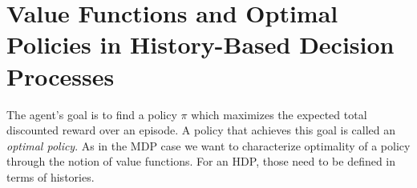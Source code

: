 \documentclass[
    a4paper,
    11pt,
    bibliography=totoc,
    listof=totoc,      
    headinclude=true,
    cleardoublepage=empty,
]{scrbook}
\theoremstyle{plain}
\newtheorem{lemma}[theorem]{Lemma}
\theoremstyle{definition}
\theoremstyle{remark}
\newcommand{\PM}{\mathbb P}
\newcommand{\SpaceA}{{\cal A}}
\newcommand{\SpaceO}{{\cal O}}
\newcommand{\SpaceH}{{\cal H}}
\begin{document}

\section[Value Functions and Optimal Policies in HDPs]{Value Functions and Optimal Policies in History-Based Decision Processes}
\label{chapter:HistoryRLEnvironment:section:ValueQFunctions}

The agent's goal is to find a policy $\pi$ which maximizes the expected total 
discounted reward over an episode. A policy that achieves this goal is called 
an \textit{optimal policy}. As in the MDP case we want to characterize 
optimality of a policy through the notion of value functions. For an HDP, 
those need to be defined in terms of histories.
\end{document}
